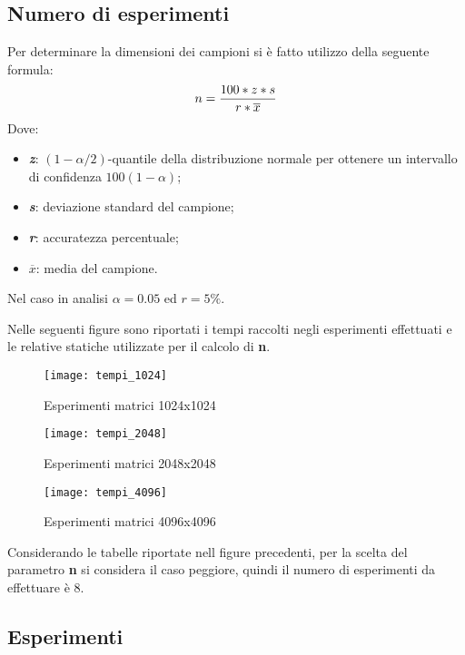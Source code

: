 \subsection{Numero di esperimenti}

Per determinare la dimensioni dei campioni si è fatto utilizzo della seguente formula:
$$n= {{100*z*s} \over{r*\overline{x}}}$$
Dove:
\begin{itemize}
  \item \textbf{\textit{z}}: $(1-{\alpha / 2})$-quantile della distribuzione normale
  per ottenere un intervallo di confidenza $100(1-\alpha)$;
  \item \textbf{\textit{s}}: deviazione standard del campione;
  \item \textbf{\textit{r}}: accuratezza percentuale;
  \item \textbf{\textit{$\overline{x}$}}: media del campione.
\end{itemize}

Nel caso in analisi $\alpha = 0.05$ ed $ r = 5\% $.

Nelle seguenti figure sono riportati i tempi raccolti negli esperimenti effettuati
e le relative statiche utilizzate per il calcolo di \textbf{n}.
\begin{figure}[!htbp]
  \texttt{[image: tempi\_1024]}
  \caption{Esperimenti matrici 1024x1024}
  \label{tempi_1024}
\end{figure}

\begin{figure}[!htbp]
  \texttt{[image: tempi\_2048]}
  \caption{Esperimenti matrici 2048x2048}
  \label{tempi_2048}
\end{figure}

\begin{figure}[!htbp]
  \texttt{[image: tempi\_4096]}
  \caption{Esperimenti matrici 4096x4096}
  \label{tempi_4096}
\end{figure}

\clearpage

Considerando le tabelle riportate nell figure precedenti,
per la scelta del parametro \textbf{n} si considera il caso peggiore,
quindi il numero di esperimenti da effettuare è 8.\\

\subsection{Esperimenti}

